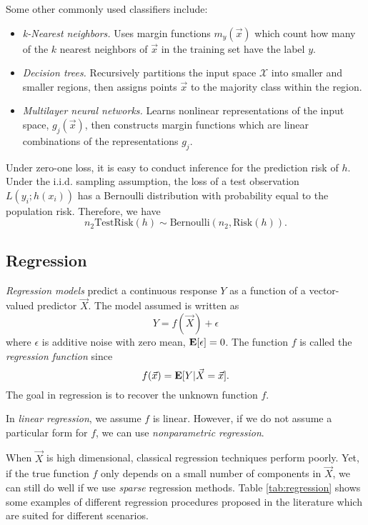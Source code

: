 Some other commonly used classifiers include:
\begin{itemize}
\item \emph{k-Nearest neighbors.}  Uses margin functions
  $m_y(\vec{x})$ which count how many of the $k$ nearest neighbors of
  $\vec{x}$ in the training set have the label $y$.
\item \emph{Decision trees.}  Recursively partitions the input space
  $\mathcal{X}$ into smaller and smaller regions, then assigns points
  $\vec{x}$ to the majority class within the region.
\item \emph{Multilayer neural networks.}  Learns nonlinear
  representations of the input space, $g_j(\vec{x})$, then constructs
  margin functions which are linear combinations of the
  representations $g_j$.
\end{itemize}


Under zero-one loss, it is easy to conduct inference for the
prediction risk of $h$.  Under the i.i.d. sampling assumption, the
loss of a test observation $L(y_i; h(x_i))$ has a Bernoulli
distribution with probability equal to the population risk.  Therefore,
we have
\[
n_2 \text{TestRisk}(h) \sim \text{Bernoulli}(n_2, \text{Risk}(h)).
\]


\subsection{Regression}

\emph{Regression models} predict a continuous response $Y$ as a function of a vector-valued predictor $\vec{X}$.
The model assumed is written as
\[
Y = f(\vec{X}) + \epsilon
\]
where $\epsilon$ is additive noise with zero mean, $\textbf{E}[\epsilon] = 0$.
The function $f$ is called the \emph{regression function} since
\[
f(\vec{x}) = \textbf{E}[Y|\vec{X} = \vec{x}].
\]
The goal in regression is to recover the unknown function $f$.

In \emph{linear regression}, we assume $f$ is linear. However, if we
do not assume a particular form for $f$, we can use
\emph{nonparametric regression}.

When $\vec{X}$ is high dimensional, classical regression techniques
perform poorly.  Yet, if the true function $f$ only depends on a small
number of components in $\vec{X}$, we can still do well if we use
\emph{sparse} regression methods. Table \ref{tab:regression} shows
some examples of different regression procedures proposed in the
literature which are suited for different scenarios.

